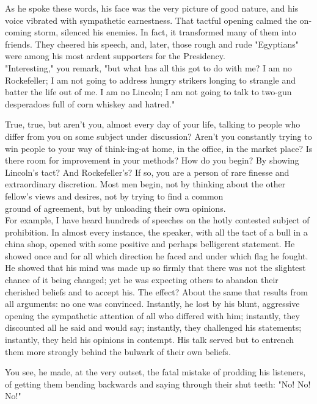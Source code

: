 \documentclass[10pt]{article}
\begin{document}
As he spoke these words, his face was the very picture of good nature, and his voice vibrated with sympathetic earnestness. That tactful opening calmed the on-coming storm, silenced his enemies. In fact, it transformed many of them into friends. They cheered his speech, and, later, those rough and rude "Egyptians" were among his most ardent supporters for the Presidency.\\
"Interesting," you remark, "but what has all this got to do with me? I am no Rockefeller; I am not going to address hungry strikers longing to strangle and batter the life out of me. I am no Lincoln; I am not going to talk to two-gun desperadoes full of corn whiskey and hatred."

True, true, but aren't you, almost every day of your life, talking to people who differ from you on some subject under discussion? Aren't you constantly trying to win people to your way of think-ing-at home, in the office, in the market place? Is there room for improvement in your methods? How do you begin? By showing Lincoln's tact? And Rockefeller's? If so, you are a person of rare finesse and extraordinary discretion. Most men begin, not by thinking about the other fellow's views and desires, not by trying to find a common\\
ground of agreement, but by unloading their own opinions.\\
For example, I have heard hundreds of speeches on the hotly contested subject of prohibition. In almost every instance, the speaker, with all the tact of a bull in a china shop, opened with some positive and perhaps belligerent statement. He showed once and for all which direction he faced and under which flag he fought. He showed that his mind was made up so firmly that there was not the slightest chance of it being changed; yet he was expecting others to abandon their cherished beliefs and to accept his. The effect? About the same that results from all arguments: no one was convinced. Instantly, he lost by his blunt, aggressive opening the sympathetic attention of all who differed with him; instantly, they discounted all he said and would say; instantly, they challenged his statements; instantly, they held his opinions in contempt. His talk served but to entrench them more strongly behind the bulwark of their own beliefs.

You see, he made, at the very outset, the fatal mistake of prodding his listeners, of getting them bending backwards and saying through their shut teeth: "No! No! No!"
\end{document}

